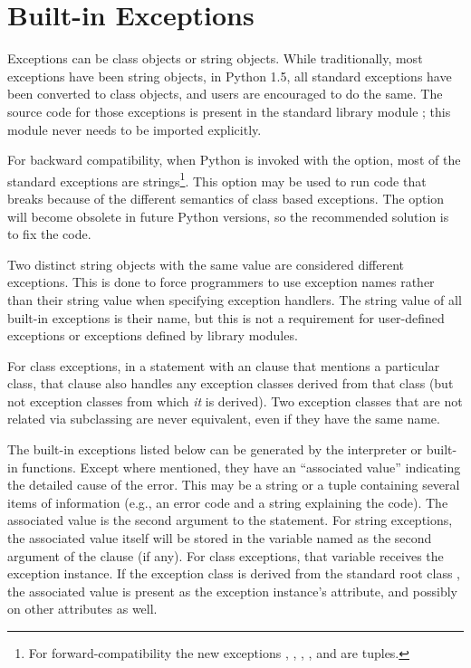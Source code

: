 \section{Built-in Exceptions}



Exceptions can be class objects or string objects.  While
traditionally, most exceptions have been string objects, in Python
1.5, all standard exceptions have been converted to class objects,
and users are encouraged to do the same.  The source code for those
exceptions is present in the standard library module
; this module never needs to be imported explicitly.

For backward compatibility, when Python is invoked with the 
option, most of the standard exceptions are strings\footnote{For
forward-compatibility the new exceptions ,
,
, , and
 are tuples.}.  This option may be used to
run code that breaks because of the different semantics of class based
exceptions.  The  option will become obsolete in future
Python versions, so the recommended solution is to fix the code.

Two distinct string objects with the same value are considered different
exceptions.  This is done to force programmers to use exception names
rather than their string value when specifying exception handlers.
The string value of all built-in exceptions is their name, but this is
not a requirement for user-defined exceptions or exceptions defined by
library modules.

For class exceptions, in a  statement with an 
clause that mentions a particular class, that clause also handles
any exception classes derived from that class (but not exception
classes from which \emph{it} is derived).  Two exception classes
that are not related via subclassing are never equivalent, even if
they have the same name.

The built-in exceptions listed below can be generated by the
interpreter or built-in functions.  Except where mentioned, they have
an ``associated value'' indicating the detailed cause of the error.
This may be a string or a tuple containing several items of
information (e.g., an error code and a string explaining the code).
The associated value is the second argument to the 
statement.  For string exceptions, the associated value itself will be
stored in the variable named as the second argument of the
 clause (if any).  For class exceptions, that variable
receives the exception instance.  If the exception class is derived
from the standard root class , the associated
value is present as the exception instance's  attribute,
and possibly on other attributes as well.


